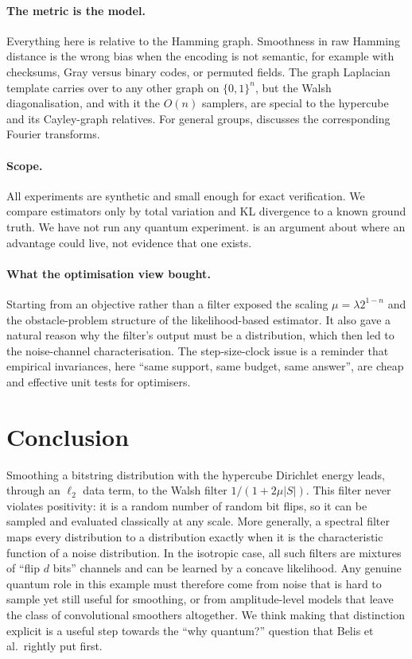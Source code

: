 \documentclass[11pt]{article}
\theoremstyle{definition}
\theoremstyle{remark}
\newcommand{\B}{\{0,1\}^n}
\begin{document}
\paragraph{The metric is the model.}
Everything here is relative to the Hamming graph. Smoothness in raw Hamming distance is the wrong bias when the encoding is not semantic, for example with checksums, Gray versus binary codes, or permuted fields. The graph Laplacian template carries over to any other graph on $\B$, but the Walsh diagonalisation, and with it the $O(n)$ samplers, are special to the hypercube and its Cayley-graph relatives. For general groups, \cite{belis2026spectral} discusses the corresponding Fourier transforms.

\paragraph{Scope.}
All experiments are synthetic and small enough for exact verification. We compare estimators only by total variation and KL divergence to a known ground truth. We have not run any quantum experiment.  is an argument about where an advantage could live, not evidence that one exists.

\paragraph{What the optimisation view bought.}
Starting from an objective rather than a filter exposed the scaling $\mu=\lambda2^{1-n}$ and the obstacle-problem structure of the likelihood-based estimator. It also gave a natural reason why the filter's output must be a distribution, which then led to the noise-channel characterisation. The step-size-clock issue is a reminder that empirical invariances, here ``same support, same budget, same answer'', are cheap and effective unit tests for optimisers.

\section{Conclusion}

Smoothing a bitstring distribution with the hypercube Dirichlet energy leads, through an $\ell_2$ data term, to the Walsh filter $1/(1+2\mu|S|)$. This filter never violates positivity: it is a random number of random bit flips, so it can be sampled and evaluated classically at any scale. More generally, a spectral filter maps every distribution to a distribution exactly when it is the characteristic function of a noise distribution. In the isotropic case, all such filters are mixtures of ``flip $d$ bits'' channels and can be learned by a concave likelihood. Any genuine quantum role in this example must therefore come from noise that is hard to sample yet still useful for smoothing, or from amplitude-level models that leave the class of convolutional smoothers altogether. We think making that distinction explicit is a useful step towards the ``why quantum?'' question that Belis et al.\ rightly put first.
\end{document}
